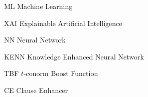 \begin{abbreviations}
\item[ML] Machine Learning
\item[XAI] Explainable Artificial Intelligence
\item[NN] Neural Network
\item[KENN] Knowledge Enhanced Neural Network
\item[TBF] $t$-conorm Boost Function
\item[CE] Clause Enhancer
\end{abbreviations}

